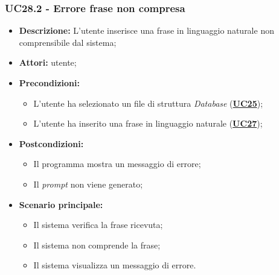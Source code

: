 \subsubsection{UC28.2 - Errore frase non compresa}
\label{sec:UC28.2}
\begin{itemize}
	\item \textbf{Descrizione:} L’utente inserisce una frase in linguaggio naturale non comprensibile dal sistema;
	\item \textbf{Attori:} utente;
	\item \textbf{Precondizioni:} 
	\begin{itemize}
		\item L’utente ha selezionato un file di struttura \textit{Database} (\hyperref[sec:UC25]{\textbf{UC25}});
		\item L'utente ha inserito una frase in linguaggio naturale (\hyperref[sec:UC27]{\textbf{UC27}});
	\end{itemize}
	\item \textbf{Postcondizioni:} 
	\begin{itemize}
		\item Il programma mostra un messaggio di errore;
		\item Il \textit{prompt} non viene generato;
	\end{itemize}
	\item \textbf{Scenario principale:} 
	\begin{itemize}
		\item Il sistema verifica la frase ricevuta;
		\item Il sistema non comprende la frase;
		\item Il sistema visualizza un messaggio di errore.
	\end{itemize}
\end{itemize}


